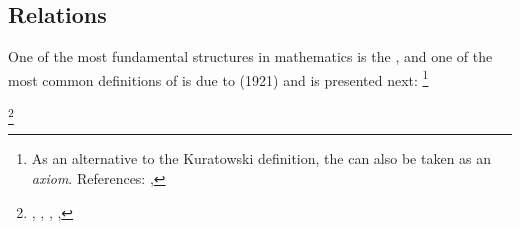 \subsection{Relations}



One of the most fundamental structures in mathematics is the ,
and one of the most common definitions of  is due to
 (1921) and is presented next:%
\footnote{%
  As an alternative to the Kuratowski definition, 
  the  can also be taken as an \emph{axiom}. References: 
      ,
  }
\begin{definition}
\footnote{
  ,
  ,
  ,
  ,
  }
\label{def:(a,b)}
\label{def:opair}
\end{definition}

